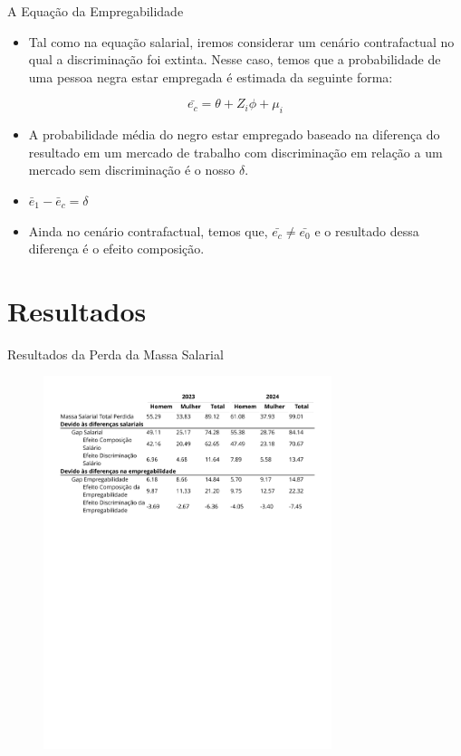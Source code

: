 \documentclass[10pt, xcolor=x11names,compress]{beamer}
\begin{document}
	\begin{frame}{A Equação da Empregabilidade}
		\begin{itemize}
			\item Tal como na equação salarial, iremos considerar um cenário contrafactual no qual a discriminação foi extinta. Nesse caso, temos que a probabilidade de uma pessoa negra estar empregada é estimada da seguinte forma:
		\end{itemize}
		\begin{equation}
				\bar{e_{c}} = \theta + Z_{i}\phi + \mu_{i}
		\end{equation}
		\begin{itemize}
			\item A probabilidade média do negro estar empregado baseado na diferença do resultado em um mercado de trabalho com discriminação em relação a um mercado sem discriminação é o nosso $\delta$.
			\item $ \bar{e}_{1} - \bar{e}_{c}= \delta$
			\item Ainda no cenário contrafactual, temos que, $\bar{e_{c}} \neq \bar{e_{0}}$ e o resultado dessa diferença é o efeito composição.
		\end{itemize}
	\end{frame}
	
		\section{Resultados}
		\begin{frame}{ Resultados da Perda da Massa Salarial}
		\begin{figure}
			\centering
			\includegraphics[width = 0.75\textwidth]{tables_output/table_massa.pdf}
		\end{figure}
		\end{frame}		
		
\end{document}
